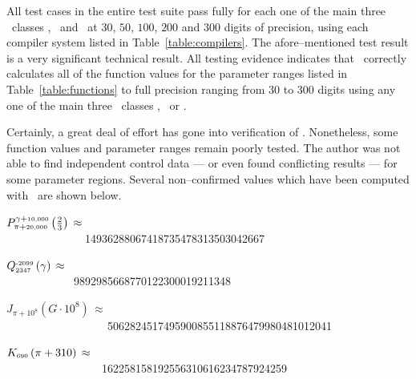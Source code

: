 All test cases in the entire test suite pass fully for each one
of the main three
\efloatclass\ classes \efxefloatclass, \gmpefloatclass\ and
\mpfrefloatclass\ at $30$, $50$, $100$, $200$ and $300$ digits
of precision, using each compiler system listed in
Table~\ref{table:compilers}.
The afore--mentioned test result is a very significant technical result.
All testing evidence indicates
that \efloat\ correctly calculates all of the function values for the
parameter ranges listed in Table~\ref{table:functions} to full precision
ranging from $30$ to $300$ digits using any one of the main three
\efloatclass\ classes \efxefloatclass, \gmpefloatclass\ or \mpfrefloatclass.

Certainly, a great deal of effort has gone into verification of \efloat.
Nonetheless, some function values and parameter ranges remain
poorly tested. The author was not able to find independent
control data --- or even found conflicting results --- for some
parameter regions. Several non--confirmed values which have been
computed with \efloat\ are shown below.

\vspace{5.0pt}

{\raggedright
$P_{\pi+{\mbox{\tiny{20,000}}}}^{\gamma+{\mbox{\tiny{10,000}}}}\left(\frac{2}{3}\right)\,\approx\,$
{
\nopagebreak
\\ \ \ \ \ \ \ \ \ \ \ \ \ \ \ 
14936288067418735478313503042667}
}

\vspace{5.0pt}

{\raggedright
$Q_{{\mbox{\tiny{2347}}}}^{{\mbox{\tiny{-2099}}}}\left(\gamma\right)\,\approx\,$
{
\nopagebreak
\\ \ \ \ \ \ \ \ \ \ \ \ \ 
9892985668770122300019211348}
}

\vspace{5.0pt}

{\raggedright
$J_{\pi+10^{8}}\left(G\cdot 10^{8}\right)\,\approx\,$
{
\nopagebreak
\\ \ \ \ \ \ \ \ \ \ \ \ \ \ \ \ \ \ \ 
5062824517495900855118876479980481012041}
}

\vspace{5.0pt}

{\raggedright
$K_{{\mbox{\tiny{690}}}}\left(\pi+310\right)\,\approx\,$
{
\nopagebreak
\\ \ \ \ \ \ \ \ \ \ \ \ \ \ \ \ \ \ 
162258158192556310616234787924259}
}

